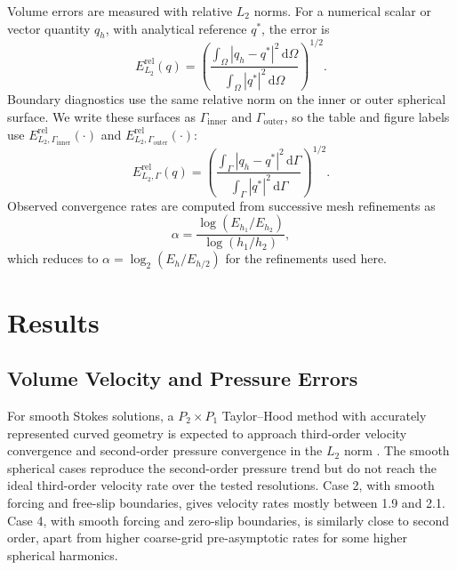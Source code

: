 \documentclass[gmd, manuscript]{copernicus}
\begin{document}
Volume errors are measured with relative \(L_2\) norms. For a numerical scalar
or vector quantity \(q_h\), with analytical reference \(q^*\), the error is
\begin{equation}
  E_{L_2}^{\mathrm{rel}}(q)
  =
  \left(
  \frac{\int_\Omega |q_h-q^*|^2\,\mathrm{d}\Omega}
       {\int_\Omega |q^*|^2\,\mathrm{d}\Omega}
  \right)^{1/2}.
\end{equation}
Boundary diagnostics use the same relative norm on the inner or outer spherical
surface. We write these surfaces as \(\Gamma_{\mathrm{inner}}\) and
\(\Gamma_{\mathrm{outer}}\), so the table and figure labels use
\(E_{L_2,\Gamma_{\mathrm{inner}}}^{\mathrm{rel}}(\cdot)\) and
\(E_{L_2,\Gamma_{\mathrm{outer}}}^{\mathrm{rel}}(\cdot)\):
\begin{equation}
  E_{L_2,\Gamma}^{\mathrm{rel}}(q)
  =
  \left(
  \frac{\int_\Gamma |q_h-q^*|^2\,\mathrm{d}\Gamma}
       {\int_\Gamma |q^*|^2\,\mathrm{d}\Gamma}
  \right)^{1/2}.
\end{equation}
Observed convergence rates are computed from successive mesh refinements as
\begin{equation}
  \alpha
  =
  \frac{\log(E_{h_1}/E_{h_2})}{\log(h_1/h_2)} ,
\end{equation}
which reduces to \(\alpha=\log_2(E_{h}/E_{h/2})\) for the refinements used
here.

\section{Results}

\subsection{Volume Velocity and Pressure Errors}

For smooth Stokes solutions, a \(P_2\times P_1\) Taylor--Hood method with
accurately represented curved geometry is expected to approach third-order
velocity convergence and second-order pressure convergence in the \(L_2\) norm
\citep{girault1986,boffi2013}. The  smooth spherical
cases reproduce the second-order pressure trend but do not reach the ideal
third-order velocity rate over the tested resolutions. Case 2, with smooth
forcing and free-slip boundaries, gives velocity rates mostly between 1.9 and
2.1. Case 4, with smooth forcing and zero-slip boundaries, is similarly close
to second order, apart from higher coarse-grid pre-asymptotic rates for some
higher spherical harmonics.
\end{document}
